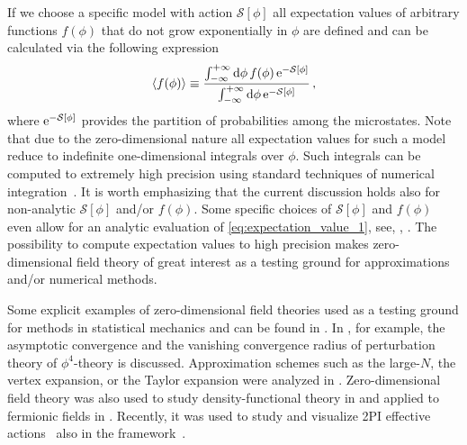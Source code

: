 If we choose a specific model with action $\mathcal{S}[\phi]$ all expectation values of arbitrary functions $f(\phi)$ that do not grow exponentially in $\phi$ are defined and can be calculated via the following expression
\begin{align}
	\langle f(\phi) \rangle \equiv \frac{\int_{-\infty}^{+\infty} \dif \phi \, f(\phi) \, \eu^{ - \mathcal{S}[\phi] }}{\int_{-\infty}^{+\infty} \dif \phi \, \eu^{ - \mathcal{S}[\phi] }} \, ,	\label{eq:expectation_value_1}
\end{align}
where $\mathrm{e}^{ - \mathcal{S}[\phi] }$ provides the partition of probabilities among the microstates.
Note that due to the zero-dimensional nature all expectation values for such a model reduce to indefinite one-dimensional integrals over $\phi$.
Such integrals can be computed to extremely high precision using standard techniques of numerical integration~\cite{Press:1992zz,PresTeukVettFlan92}.
It is worth emphasizing that the current discussion holds also for non-analytic $\mathcal{S}[\phi]$ and/or $f(\phi)$.
Some specific choices of $\mathcal{S}[\phi]$ and $f(\phi)$ even allow for an analytic evaluation of \cref{eq:expectation_value_1}, see, \eg{}, .
The possibility to compute expectation values to high precision makes zero-dimensional field theory of great interest as a testing ground for approximations and/or numerical methods.

Some explicit examples of zero-dimensional field theories used as a testing ground for methods in statistical mechanics and \qft{} can be found in .
In , for example, the asymptotic convergence and the vanishing convergence radius of perturbation theory of $\phi^4$-theory is discussed.
Approximation schemes such as the large-$N$, the \frg{} vertex expansion, or the \frg{} Taylor expansion were analyzed in .
Zero-dimensional field theory was also used to study density-functional theory in  and applied to fermionic fields in .
Recently, it was used to study and visualize 2PI effective actions~\cite{Millington:2019nkw} \dash{} also in the \frg{} framework~\cite{Alexander:2019cgw,Millington:2020Talk,Millington:2021ftp}.

